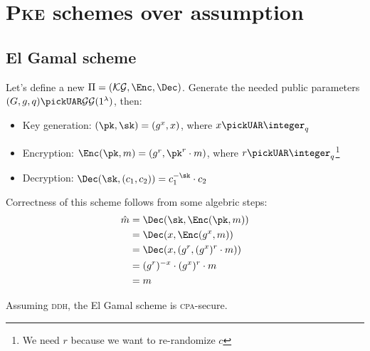 
\section{\textsc{Pke} schemes over \ddh assumption}

\subsection{El Gamal scheme}

Let's define a new $\Pi = (\keygen, \Enc, \Dec)$. Generate the needed public parameters $(G,g,q) \pickUAR \groupgen(1^{\lambda})$\footnotemark, then:


\begin{itemize}
    \item Key generation: $(\pk, \sk) = (g^x, x)$, where $x \pickUAR \integer_q$
    \item Encryption: $\Enc(\pk, m) = (g^r, \pk^r \cdot m)$, where $r \pickUAR \integer_q$\footnote{We need $r$ because we want to re-randomize $c$}
    \item Decryption: $\Dec(\sk, (c_1, c_2))= c_1^{-\sk} \cdot c_2$
\end{itemize}

Correctness of this scheme follows from some algebric steps:
\begin{align*}
    \hat{m} &= \Dec(\sk, \Enc(\pk, m))          \\
            &= \Dec(x, \Enc(g^x, m))            \\
            &= \Dec(x, (g^r, (g^x)^r \cdot m))  \\
            &= (g^r)^{-x} \cdot (g^x)^r \cdot m \\
            &= m                                \\
\end{align*}

\begin{theorem}
    Assuming \textsc{ddh}, the El Gamal scheme is \textsc{cpa}-secure.
\end{theorem}

